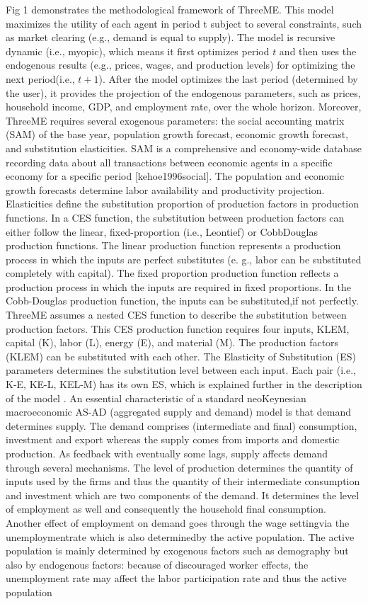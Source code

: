 \documentclass[
  letterpaper,
  DIV=11,
  numbers=noendperiod]{scrartcl}
\begin{document}
Fig 1 demonstrates the methodological framework of ThreeME. This model
maximizes the utility of each agent in period t subject to several
constraints, such as market clearing (e.g., demand is equal to supply).
The model is recursive dynamic (i.e., myopic), which means it first
optimizes period \(t\) and then uses the endogenous results (e.g.,
prices, wages, and production levels) for optimizing the next
period(i.e., \(t + 1\)). After the model optimizes the last period
(determined by the user), it provides the projection of the endogenous
parameters, such as prices, household income, GDP, and employment rate,
over the whole horizon. Moreover, ThreeME requires several exogenous
parameters: the social accounting matrix (SAM) of the base year,
population growth forecast, economic growth forecast, and substitution
elasticities. SAM is a comprehensive and economy-wide database recording
data about all transactions between economic agents in a specific
economy for a specific period {[}kehoe1996social{]}. The population and
economic growth forecasts determine labor availability and productivity
projection. Elasticities define the substitution proportion of
production factors in production functions. In a CES function, the
substitution between production factors can either follow the linear,
fixed-proportion (i.e., Leontief) or CobbDouglas production functions.
The linear production function represents a production process in which
the inputs are perfect substitutes (e. g., labor can be substituted
completely with capital). The fixed proportion production function
reflects a production process in which the inputs are required in fixed
proportions. In the Cobb-Douglas production function, the inputs can be
substituted,if not perfectly. ThreeME assumes a nested CES function
\citep{reynes2019cobb} to describe the substitution between production
factors. This CES production function requires four inputs, KLEM,
capital (K), labor (L), energy (E), and material (M). The production
factors (KLEM) can be substituted with each other. The Elasticity of
Substitution (ES) parameters determines the substitution level between
each input. Each pair (i.e., K-E, KE-L, KEL-M) has its own ES, which is
explained further in the description of the model
\citep{reynes2021threeme}. An essential characteristic of a standard
neoKeynesian macroeconomic AS-AD (aggregated supply and demand) model is
that demand determines supply. The demand comprises (intermediate and
final) consumption, investment and export whereas the supply comes from
imports and domestic production. As feedback with eventually some lags,
supply affects demand through several mechanisms. The level of
production determines the quantity of inputs used by the firms and thus
the quantity of their intermediate consumption and investment which are
two components of the demand. It determines the level of employment as
well and consequently the household final consumption. Another effect of
employment on demand goes through the wage settingvia the
unemploymentrate which is also determinedby the active population. The
active population is mainly determined by exogenous factors such as
demography but also by endogenous factors: because of discouraged worker
effects, the unemployment rate may affect the labor participation rate
and thus the active population
\end{document}
